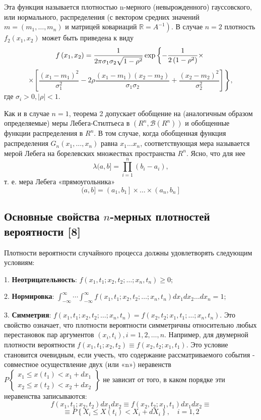 Эта функция называется плотностью n-мерного (невырожденного) гауссовского, или нормального, распределения (с вектором средних значений $m=\left(m_1, \ldots, m_n\right)$ и матрицей ковариаций $\left.\mathbb{R}=A^{-1}\right)$.
В случае $n=2$ плотность $f_2\left(x_1, x_2\right)$ может быть приведена к виду
$$
 f\left(x_1, x_2\right)=\frac{1}{2 \pi \sigma_1 \sigma_2 \sqrt{1-\rho^2}} \exp \left\{-\frac{1}{2\left(1-\rho^2\right)} \times\right. \\
$$
$$
\left.\times\left[\frac{\left(x_1-m_1\right)^2}{\sigma_1^2}-2 \rho \frac{\left(x_1-m_1\right)\left(x_2-m_2\right)}{\sigma_1 \sigma_2}+\frac{\left(x_2-m_2\right)^2}{\sigma_2^2}\right]\right\} ,
$$
где $\sigma_i>0,|\rho|<1$.

\begin{remark} Как и в случае $n=1$, теорема 2 допускает обобщение на (аналогичным образом определяемые) меры Лебега-Стилтьеса в $\left(R^n, \mathscr{B}\left(R^n\right)\right)$ и обобщенные функции распределения в $R^n$. В том случае, когда обобщенная функция распределения $G_n\left(x_1, \ldots, x_n\right)$ равна $x_1 \ldots x_n$, соответствующая мера называется мерой Лебега на борелевских множествах пространства $R^n$. Ясно, что для нее
$$
\lambda(a, b]=\prod_{i=1}^n\left(b_i-a_i\right),
$$
т. е. мера Лебега «прямоугольника»
$$
(a, b]=\left(a_1, b_1\right] \times \ldots \times\left(a_n, b_n\right]
$$
\end{remark}

\subsection{Основные свойства $n$-мерных плотностей вероятности [8]} %
Плотности вероятности случайного процесса должны удовлетворять следующим условиям:

1. \textbf{Неотрицательность}: $f\left(x_1, t_1 ; x_2, t_2 ; \ldots ; x_n, t_n\right) \geq 0$;

2. \textbf{Нормировка}: $\int_{-\infty}^{\infty} \cdots \int_{-\infty}^{\infty} f\left(x_1, t_1 ; x_2, t_2 ; \ldots ; x_n, t_n\right) d x_1 d x_2 \ldots d x_n=1$;

3. \textbf{Симметрия}: $f\left(x_1, t_1 ; x_2, t_2 ; \ldots ; x_n, t_n\right)=f\left(x_2, t_2 ; x_1, t_1 ; \ldots ; x_n, t_n\right).$
Это свойство означает, что плотности вероятности симметричны относительно любых перестановок пар аргументов $\left(x_i, t_i\right), i=1,2, \ldots, n$. Например, для двумерной плотности вероятности $f\left(x_1, t_1 ; x_2, t_2\right) \equiv f\left(x_2, t_2 ; x_1, t_1\right)$. Это условие становится очевидным, если учесть, что содержание рассматриваемого события - совместное осуществление двух (или «n») неравенств $P\left\{\begin{array}{c}x_1 \leq x\left(t_1\right)<x_1+d x_1 \\ x_2 \leq x\left(t_2\right)<x_2+d x_2\end{array}\right\}$ не зависит от того, в каком порядке эти неравенства записываются:
$$
f\left(x_1, t_1 ; x_2, t_2\right) d x_1 d x_2 \equiv f\left(x_2, t_2 ; x_1, t_1\right) d x_1 d x_2 \equiv 
$$
$$ 
\equiv P\left\{X_i \leq X\left(t_i\right)<X_i+d X_i\right\}, \quad i=1,2
$$

